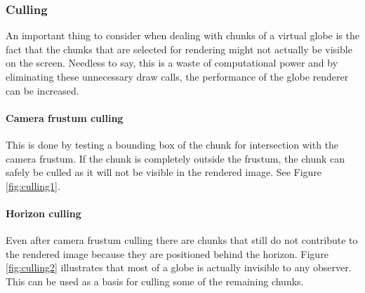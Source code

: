 \subsubsection{Culling}
An important thing to consider when dealing with chunks of a virtual globe is the fact that the chunks that are selected for rendering might not actually be visible on the screen. Needless to say, this is a waste of computational power and by eliminating these unnecessary draw calls, the performance of the globe renderer can be increased.

\paragraph{Camera frustum culling} This is done by testing a bounding box of the chunk for intersection with the camera frustum. If the chunk is completely outside the frustum, the chunk can safely be culled as it will not be visible in the rendered image. See Figure \ref{fig:culling1}.

\paragraph{Horizon culling} Even after camera frustum culling there are chunks that still do not contribute to the rendered image because they are positioned behind the horizon. Figure \ref{fig:culling2} illustrates that most of a globe is actually invisible to any observer. This can be used as a basis for culling some of the remaining chunks. 

